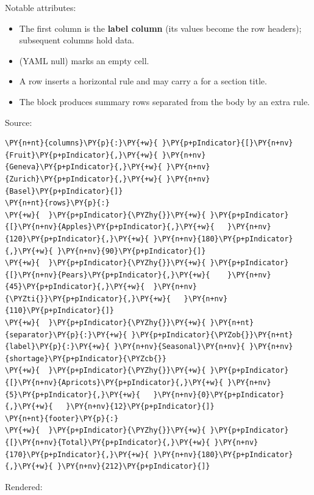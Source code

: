 \documentclass[a4paper,twoside]{article}
\begin{document}
Notable attributes:
\begin{itemize}
\item The first column is the \textbf{label column} (its values become the row
headers); subsequent columns hold data.
\item \tscodeinline{\textasciitilde{}} (YAML null) marks an empty cell.
\item A  row inserts a horizontal rule and may carry a  for
a section title.
\item The  block produces summary rows separated from the body by an
extra rule.
\end{itemize}
Source:
\begin{tscode}[lang=yaml, engine=pygments]
\begin{Verbatim}[commandchars=\\\{\},breaklines, breakanywhere, commandchars=\\\{\}]
\PY{n+nt}{columns}\PY{p}{:}\PY{+w}{ }\PY{p+pIndicator}{[}\PY{n+nv}{Fruit}\PY{p+pIndicator}{,}\PY{+w}{ }\PY{n+nv}{Geneva}\PY{p+pIndicator}{,}\PY{+w}{ }\PY{n+nv}{Zurich}\PY{p+pIndicator}{,}\PY{+w}{ }\PY{n+nv}{Basel}\PY{p+pIndicator}{]}
\PY{n+nt}{rows}\PY{p}{:}
\PY{+w}{  }\PY{p+pIndicator}{\PYZhy{}}\PY{+w}{ }\PY{p+pIndicator}{[}\PY{n+nv}{Apples}\PY{p+pIndicator}{,}\PY{+w}{   }\PY{n+nv}{120}\PY{p+pIndicator}{,}\PY{+w}{ }\PY{n+nv}{180}\PY{p+pIndicator}{,}\PY{+w}{ }\PY{n+nv}{90}\PY{p+pIndicator}{]}
\PY{+w}{  }\PY{p+pIndicator}{\PYZhy{}}\PY{+w}{ }\PY{p+pIndicator}{[}\PY{n+nv}{Pears}\PY{p+pIndicator}{,}\PY{+w}{    }\PY{n+nv}{45}\PY{p+pIndicator}{,}\PY{+w}{  }\PY{n+nv}{\PYZti{}}\PY{p+pIndicator}{,}\PY{+w}{   }\PY{n+nv}{110}\PY{p+pIndicator}{]}
\PY{+w}{  }\PY{p+pIndicator}{\PYZhy{}}\PY{+w}{ }\PY{n+nt}{separator}\PY{p}{:}\PY{+w}{ }\PY{p+pIndicator}{\PYZob{}}\PY{n+nt}{label}\PY{p}{:}\PY{+w}{ }\PY{n+nv}{Seasonal}\PY{n+nv}{ }\PY{n+nv}{shortage}\PY{p+pIndicator}{\PYZcb{}}
\PY{+w}{  }\PY{p+pIndicator}{\PYZhy{}}\PY{+w}{ }\PY{p+pIndicator}{[}\PY{n+nv}{Apricots}\PY{p+pIndicator}{,}\PY{+w}{ }\PY{n+nv}{5}\PY{p+pIndicator}{,}\PY{+w}{   }\PY{n+nv}{0}\PY{p+pIndicator}{,}\PY{+w}{   }\PY{n+nv}{12}\PY{p+pIndicator}{]}
\PY{n+nt}{footer}\PY{p}{:}
\PY{+w}{  }\PY{p+pIndicator}{\PYZhy{}}\PY{+w}{ }\PY{p+pIndicator}{[}\PY{n+nv}{Total}\PY{p+pIndicator}{,}\PY{+w}{ }\PY{n+nv}{170}\PY{p+pIndicator}{,}\PY{+w}{ }\PY{n+nv}{180}\PY{p+pIndicator}{,}\PY{+w}{ }\PY{n+nv}{212}\PY{p+pIndicator}{]}
\end{Verbatim}
\end{tscode}
Rendered:
\end{document}
